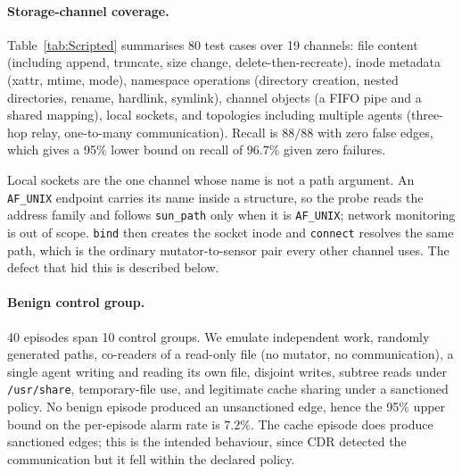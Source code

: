 \documentclass[11pt]{article}
\begin{document}
\paragraph{Storage-channel coverage.} Table~\ref{tab:Scripted} summarises 80 test cases over 19 channels: file content (including append, truncate, size change, delete-then-recreate), inode metadata (xattr, mtime, mode), namespace operations (directory creation, nested directories, rename, hardlink, symlink), channel objects (a FIFO pipe and a shared mapping), local sockets, and topologies including multiple agents (three-hop relay, one-to-many communication). Recall is $88/88$ with zero false edges, which gives a 95\% lower bound on recall of $96.7\%$ given zero failures.

Local sockets are the one channel whose name is not a path argument. An \texttt{AF\_UNIX} endpoint carries its name inside a structure, so the probe reads the address family and follows \texttt{sun\_path} only when it is \texttt{AF\_UNIX}; network monitoring is out of scope. \texttt{bind} then creates the socket inode and \texttt{connect} resolves the same path, which is the ordinary mutator-to-sensor pair every other channel uses. The defect that hid this is described below.

\paragraph{Benign control group.} 40 episodes span 10 control groups. We emulate independent work, randomly generated paths, co-readers of a read-only file (no mutator, no communication), a single agent writing and reading its own file, disjoint writes, subtree reads under \texttt{/usr/share}, temporary-file use, and legitimate cache sharing under a sanctioned policy. No benign episode produced an unsanctioned edge, hence the 95\% upper bound on the per-episode alarm rate is $7.2\%$. The cache episode does produce sanctioned edges; this is the intended behaviour, since CDR detected the communication but it fell within the declared policy.

\begin{table}[t]
\centering
\setlength{\tabcolsep}{4pt}
\caption{The \emph{live} suite containing 18 episodes with omp agents, 42 edges detected by CDR. A transcript-only monitor (representing a supervisor model) recovered none in any mode.}
\label{tab:live}
\end{table}
\end{document}
